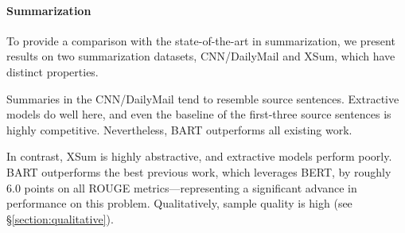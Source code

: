 \documentclass{article} %
\newcommand{\omer}[1]{{\color{blue} [Omer: #1]}}
\begin{document}

\paragraph{Summarization}
To provide a comparison with the state-of-the-art in summarization, we present results on two summarization datasets, CNN/DailyMail and XSum, which have distinct properties. 

Summaries in the CNN/DailyMail tend to resemble source sentences. Extractive models do well here, and even the baseline of the first-three source sentences is highly competitive. Nevertheless, BART outperforms all existing work.

In contrast, XSum is highly abstractive, and extractive models perform poorly. BART outperforms the best previous work, which leverages BERT, by roughly 6.0 points on all ROUGE metrics---representing a significant advance in performance on this problem. Qualitatively, sample quality is high (see \S\ref{section:qualitative}). %
\end{document}
